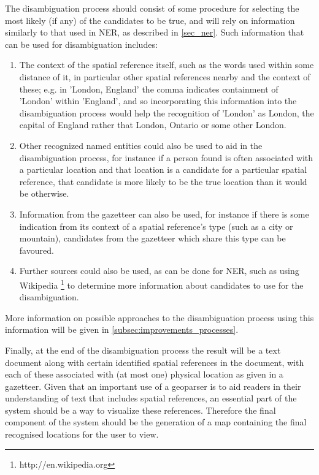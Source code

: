 \documentclass[12pt, a4paper]{report}
\begin{document}
The disambiguation process should consist of some procedure for selecting the most likely (if any) of the candidates to be true, and will rely on information similarly to that used in NER, as described in \ref{sec_ner}. Such information that can be used for disambiguation includes:

\begin{enumerate}
	\item { The context of the spatial reference itself, such as the words used within some distance of it, in particular other spatial references nearby and the context of these; e.g. in 'London, England' the comma indicates containment of 'London' within 'England', and so incorporating this information into the disambiguation process would help the recognition of 'London' as London, the capital of England rather that London, Ontario or some other London.  	}
	\item { Other recognized named entities could also be used to aid in the disambiguation process, for instance if a person found is often associated with a particular location and that location is a candidate for a particular spatial reference, that candidate is more likely to be the true location than it would be otherwise.
	} 
	\item { Information from the gazetteer can also be used, for instance if there is some indication from its context of a spatial reference's type (such as a city or mountain), candidates from the gazetteer which share this type can be favoured. 
	} 
	\item { Further sources could also be used, as can be done for NER, such as using Wikipedia \footnote{http://en.wikipedia.org} to determine more information about candidates to use for the disambiguation.
	}

\end{enumerate}

More information on possible approaches to the disambiguation process using this information will be given in \ref{subsec:improvements_processes}.

Finally, at the end of the disambiguation process the result will be a text document along with certain identified spatial references in the document, with each of these associated with (at most one) physical location as given in a gazetteer. Given that an important use of a geoparser is to aid readers in their understanding of text that includes spatial references, an essential part of the system should be a way to visualize these references. Therefore the final component of the system should be the generation of a map containing the final recognised locations for the user to view.
 
\end{document}
